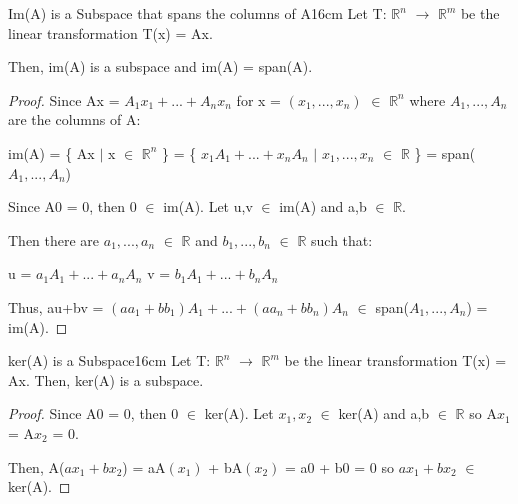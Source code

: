     \vspace{0.5cm}



    \begin{wtheorem}{Im(A) is a Subspace that spans the columns of A}{16cm}
        Let T: $\mathbb{R}^n$ $\rightarrow$ $\mathbb{R}^m$
        be the linear transformation T(x) = Ax.
        
        Then, im(A) is a subspace and im(A) = span(A).
    \end{wtheorem}

    \begin{proof}
        Since Ax = $A_1x_1 + ... + A_nx_n$
        for x = $(x_1,...,x_n)$ $\in$ $\mathbb{R}^n$
        where $A_1,...,A_n$ are the columns of A:

        \hspace{0.5cm}
        im(A) = \{ Ax $|$ x $\in$ $\mathbb{R}^n$ \}
        = \{ $x_1A_1 + ... + x_nA_n$ $|$ $x_1,...,x_n$ $\in$ $\mathbb{R}$ \}
        = span($A_1,...,A_n$)

        Since A0 = 0, then 0 $\in$ im(A).
        Let u,v $\in$ im(A) and a,b $\in$ $\mathbb{R}$.

        Then there are $a_1,...,a_n$ $\in$ $\mathbb{R}$ and
        $b_1,...,b_n$ $\in$ $\mathbb{R}$ such that:

        \hspace{0.5cm}
        u = $a_1A_1 + ... + a_nA_n$
        \hspace{1cm}
        v = $b_1A_1 + ... + b_nA_n$

        Thus, au+bv = $(aa_1+bb_1)A_1 + ... + (aa_n+bb_n)A_n$
        $\in$ span($A_1,...,A_n$) = im(A).
    \end{proof}

    \vspace{0.5cm}



    \begin{wtheorem}{ker(A) is a Subspace}{16cm}
        Let T: $\mathbb{R}^n$ $\rightarrow$ $\mathbb{R}^m$
        be the linear transformation T(x) = Ax.
        Then, ker(A) is a subspace.
    \end{wtheorem}

    \begin{proof}
        Since A0 = 0, then 0 $\in$ ker(A).
        Let $x_1,x_2$ $\in$ ker(A) and a,b $\in$ $\mathbb{R}$
        so A$x_1$ = A$x_2$ = 0.
        
        Then, A($ax_1 + bx_2$)
        = aA$(x_1)$ + bA$(x_2)$
        = a0 + b0 = 0
        so $ax_1+bx_2$ $\in$ ker(A).
    \end{proof}

